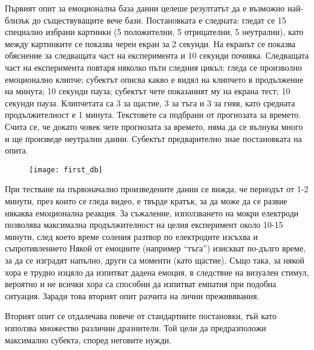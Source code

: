 \documentclass[main.tex]{subfiles}
\begin{document}
Първият опит за емоционална база данни целеше резултатът да е възможно най-близък до съществуващите вече бази.
Постановката е следната: гледат се 15 специално избрани картинки (5 положителни, 5 отрицателни, 5 неутрални), като между картинките се показва черен екран за 2 секунди. На екранът се показва обяснение за следващата част на експеримента и 10 секунди почивка. Следващата част на експеримента повтаря няколко пъти следния цикъл: гледа се произволно емоционално клипче; субектът описва какво е видял на клипчето в продължение на минута; 10 секунди пауза; субектът чете показаният му на екрана тест; 10 секунди пауза.
Клипчетата са 3 за щастие, 3 за тъга и 3 за гняв, като средната продължителност е 1 минута. Текстовете са подбрани от прогнозата за времето. Счита се, че докато човек чете прогнозата за времето, няма да се вълнува много и ще произведе неутрални данни.
Субектът предварително знае постановката на опита.

\begin{figure}[ht]%
    \texttt{[image: first\_db]}%
    \label{fig:brain_res:1}
\end{figure}

При тестване на първоначално произведените данни се вижда, че периодът от 1-2 минути, през които се гледа видео, е твърде кратък, за да може да се развие някаква емоционална реакция. За съжаление, използването на мокри електроди позволява максимална продължителност на целия експеримент около 10-15 минути, след което време соления разтвор по електродите изсъхва и съпротивлението Някой от емоциите (например ``тъга'') изискват по-дълго време, за да се изградят напълно, други са моменти (като щастие). Също така, за някой хора е трудно изцяло да изпитват дадена емоция, в следствие на визуален стимул, вероятно и не всички хора са способни да изпитват емпатия при подобна ситуация. Заради това вторият опит разчита на лични преживявания.

Вторият опит се отдалечава повече от стандартните постановки, тъй като използва множество различни дразнители. Той цели да предразположи максимално субекта, според неговите нужди.
\end{document}
